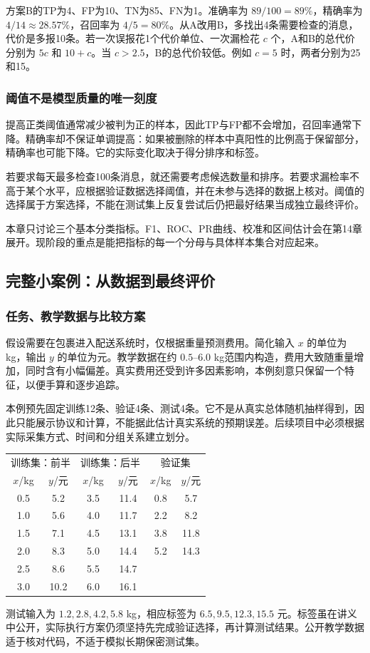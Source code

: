 \documentclass[UTF8,fontset=none,zihao=-4,a4paper]{ctexart}
\numberwithin{equation}{section}
\numberwithin{figure}{section}
\begin{document}
方案B的TP为4、FP为10、TN为85、FN为1。准确率为 $89/100=89\%$，精确率为 $4/14\approx28.57\%$，召回率为 $4/5=80\%$。从A改用B，多找出4条需要检查的消息，代价是多报10条。若一次误报花1个代价单位、一次漏检花 $c$ 个，A和B的总代价分别为 $5c$ 和 $10+c$。当 $c>2.5$，B的总代价较低。例如 $c=5$ 时，两者分别为25和15。

\subsubsection{阈值不是模型质量的唯一刻度}
提高正类阈值通常减少被判为正的样本，因此TP与FP都不会增加，召回率通常下降。精确率却不保证单调提高：如果被删除的样本中真阳性的比例高于保留部分，精确率也可能下降。它的实际变化取决于得分排序和标签。

若要求每天最多检查100条消息，就还需要考虑候选数量和排序。若要求漏检率不高于某个水平，应根据验证数据选择阈值，并在未参与选择的数据上核对。阈值的选择属于方案选择，不能在测试集上反复尝试后仍把最好结果当成独立最终评价。

本章只讨论三个基本分类指标。F1、ROC、PR曲线、校准和区间估计会在第14章展开。现阶段的重点是能把指标的每一个分母与具体样本集合对应起来。

\subsection{完整小案例：从数据到最终评价}
\subsubsection{任务、教学数据与比较方案}
假设需要在包裹进入配送系统时，仅根据重量预测费用。简化输入 $x$ 的单位为kg，输出 $y$ 的单位为元。教学数据在约 $0.5$--$6.0$ kg范围内构造，费用大致随重量增加，同时含有小幅偏差。真实费用还受到许多因素影响，本例刻意只保留一个特征，以便手算和逐步追踪。

本例预先固定训练12条、验证4条、测试4条。它不是从真实总体随机抽样得到，因此只能展示协议和计算，不能据此估计真实系统的预期误差。后续项目中必须根据实际采集方式、时间和分组关系建立划分。

\begin{center}
\begin{tabular}{cc@{\qquad}cc@{\qquad}cc}
\toprule
\multicolumn{2}{c}{训练集：前半} & \multicolumn{2}{c}{训练集：后半} & \multicolumn{2}{c}{验证集}\\
$x$/kg & $y$/元 & $x$/kg & $y$/元 & $x$/kg & $y$/元\\\midrule
0.5 & 5.2 & 3.5 & 11.4 & 0.8 & 5.7\\
1.0 & 5.6 & 4.0 & 11.7 & 2.2 & 8.2\\
1.5 & 7.1 & 4.5 & 13.1 & 3.8 & 11.8\\
2.0 & 8.3 & 5.0 & 14.4 & 5.2 & 14.3\\
2.5 & 8.6 & 5.5 & 14.7 & & \\
3.0 & 10.2 & 6.0 & 16.1 & & \\\bottomrule
\end{tabular}
\end{center}
测试输入为 $1.2,2.8,4.2,5.8$ kg，相应标签为 $6.5,9.5,12.3,15.5$ 元。标签虽在讲义中公开，实际执行方案仍须坚持先完成验证选择，再计算测试结果。公开教学数据适于核对代码，不适于模拟长期保密测试集。
\end{document}

